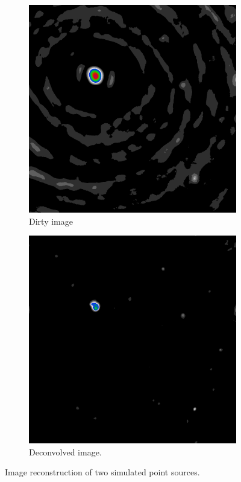 \begin{figure}[h]
\begin{subfigure}[b]{0.3\linewidth}
		\includegraphics[width=\linewidth]{./chapters/01.intro/mk2/dirty.png}
		\caption{Dirty image}
		\label{results:points:tclean}
	\end{subfigure}
	\begin{subfigure}[b]{0.3\linewidth}
		\includegraphics[width=\linewidth]{./chapters/01.intro/mk2/clean.png}
		\caption{Deconvolved image.}
		\label{results:points:tclean}
	\end{subfigure}
	
	
	\caption{Image reconstruction of two simulated point sources.}
	\label{results:points}
\end{figure}


